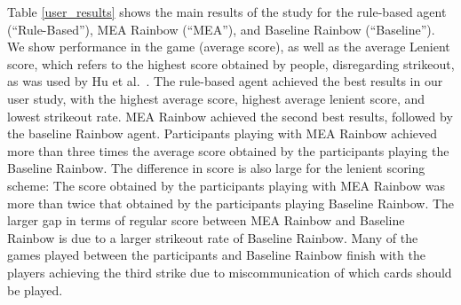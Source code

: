 \documentclass[letterpaper]{article} %
\begin{document}
Table \ref{user_results} shows the main results of the study for the rule-based agent (``Rule-Based''), MEA Rainbow (``MEA''), and Baseline Rainbow (``Baseline''). %
We show performance in the game (average score), as well as the average Lenient score, which refers to the highest score obtained by people, disregarding strikeout, as was used by Hu et al.~\cite{OP}.
The rule-based agent achieved the best results in our user study, with the highest average score, highest average lenient score, and  lowest strikeout rate. MEA Rainbow achieved the second best results, followed by the baseline Rainbow agent.
Participants playing with MEA Rainbow achieved more than three times the average score obtained by the participants playing the Baseline Rainbow. The difference in score is also large for the lenient scoring scheme: The score obtained by the participants playing with MEA Rainbow was more than twice that obtained by the participants playing Baseline Rainbow. The larger gap in terms of regular score between MEA Rainbow and Baseline Rainbow is due to a larger strikeout rate of Baseline Rainbow. Many of the games played between the participants and Baseline Rainbow finish with the players achieving the third strike due to miscommunication of which cards should be played.
\end{document}
